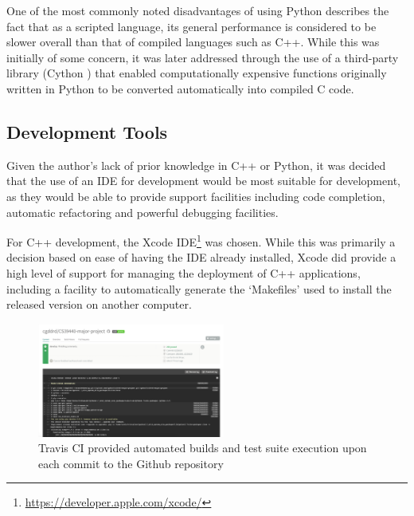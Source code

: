 One of the most commonly noted disadvantages of using Python describes the fact that as a scripted language, its general performance is considered to be slower overall than that of compiled languages such as C++. While this was initially of some concern, it was later addressed through the use of a third-party library (Cython \cite{cython}) that enabled computationally expensive functions originally written in Python to be converted automatically into compiled C code.

\subsection{Development Tools}
\label{develtools}

Given the author's lack of prior knowledge in C++ or Python, it was decided that the use of an IDE for development would be most suitable for development, as they would be able to provide support facilities including code completion, automatic refactoring and powerful debugging facilities. 

For C++ development, the Xcode IDE\footnote{\url{https://developer.apple.com/xcode/}} was chosen. While this was primarily a decision based on ease of having the IDE already installed, Xcode did provide a high level of support for managing the deployment of C++ applications, including a facility to automatically generate the `Makefiles' used to install the released version on another computer. 

\begin{figure}
	\vspace{-10pt}
  \begin{center}
    \includegraphics[width=0.55\textwidth]{images/travisci.png}
  \end{center}
  \vspace{-10pt}
  \caption{Travis CI provided automated builds and test suite execution upon each commit to the Github repository}
  \label{fig:target}
  \vspace{-10pt}
\end{figure}

